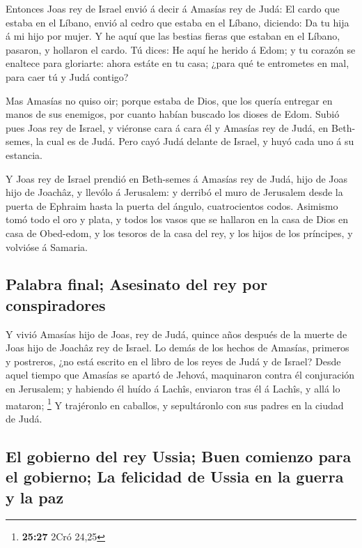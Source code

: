  Entonces Joas rey de Israel envió á decir á Amasías rey
de Judá: El cardo que estaba en el Líbano, envió al cedro que estaba en
el Líbano, diciendo: Da tu hija á mi hijo por mujer. Y he aquí que las
bestias fieras que estaban en el Líbano, pasaron, y hollaron el cardo.
 Tú dices: He aquí he herido á Edom; y tu corazón se
enaltece para gloriarte: ahora estáte en tu casa; ¿para qué te
entrometes en mal, para caer tú y Judá contigo?

 Mas Amasías no quiso oir; porque estaba de Dios, que los
quería entregar en manos de sus enemigos, por cuanto habían buscado los
dioses de Edom.  Subió pues Joas rey de Israel, y
viéronse cara á cara él y Amasías rey de Judá, en Beth-semes, la cual es
de Judá.  Pero cayó Judá delante de Israel, y huyó cada
uno á su estancia.

 Y Joas rey de Israel prendió en Beth-semes á Amasías rey
de Judá, hijo de Joas hijo de Joachâz, y llevólo á Jerusalem: y derribó
el muro de Jerusalem desde la puerta de Ephraim hasta la puerta del
ángulo, cuatrocientos codos.  Asimismo tomó todo el oro y
plata, y todos los vasos que se hallaron en la casa de Dios en casa de
Obed-edom, y los tesoros de la casa del rey, y los hijos de los
príncipes, y volvióse á Samaria.

\hypertarget{palabra-final-asesinato-del-rey-por-conspiradores}{%
\subsection{Palabra final; Asesinato del rey por
conspiradores}\label{palabra-final-asesinato-del-rey-por-conspiradores}}

 Y vivió Amasías hijo de Joas, rey de Judá, quince años
después de la muerte de Joas hijo de Joachâz rey de Israel.
 Lo demás de los hechos de Amasías, primeros y postreros,
¿no está escrito en el libro de los reyes de Judá y de Israel?
 Desde aquel tiempo que Amasías se apartó de Jehová,
maquinaron contra él conjuración en Jerusalem; y habiendo él huído á
Lachîs, enviaron tras él á Lachîs, y allá lo mataron; \footnote{\textbf{25:27}
  2Cró 24,25}  Y trajéronlo en caballos, y sepultáronlo
con sus padres en la ciudad de Judá.

\hypertarget{el-gobierno-del-rey-ussia-buen-comienzo-para-el-gobierno-la-felicidad-de-ussia-en-la-guerra-y-la-paz}{%
\subsection{El gobierno del rey Ussia; Buen comienzo para el gobierno;
La felicidad de Ussia en la guerra y la
paz}\label{el-gobierno-del-rey-ussia-buen-comienzo-para-el-gobierno-la-felicidad-de-ussia-en-la-guerra-y-la-paz}}

